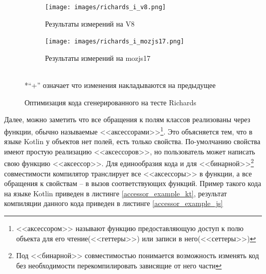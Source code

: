 \begin{figure}[ht!]
\centering
	\begin{subfigure}[b]{0.7\textwidth}
	\centering
	\texttt{[image: images/richards\_i\_v8.png]}
	\caption{Результаты измерений на V8}
    \end{subfigure}

  	\begin{subfigure}[b]{0.7\textwidth}
	\centering
	\texttt{[image: images/richards\_i\_mozjs17.png]}
	\caption{Результаты измерений на mozjs17}
    \end{subfigure}
\\*``+'' означает что изменения накладываются на предыдущее
\caption{Оптимизация кода сгенерированного на тесте Richards}
\label{richards_i}
\end{figure}


Далее, можно заметить что все обращения к полям классов реализованы через функции, обычно называемые <<аксессорами>>\footnote{<<аксессором>> называют функцию предоставляющую доступ к полю объекта для его чтение(<<геттеры>>) или записи в него(<<сеттеры>>)}. Это объясняется тем, что в языке Kotlin у объектов нет полей, есть только свойства. По-умолчанию свойства имеют простую реализацию <<аксессоров>>, но пользователь может написать свою функцию <<аксессор>>. Для единообразия кода и для <<бинарной>>\footnote{Под <<бинарной>> совместимостью понимается возможность изменять код без необходимости перекомпилировать зависящие от него части}
совместимости компилятор транслирует все <<аксессоры>> в функции, а все обращения к свойствам -- в вызов соответствующих функций. Пример такого кода на языке Kotlin приведен в листинге \ref{accessor_example_kt}, результат компиляции данного кода приведен в листинге \ref{accessor_example_js}

\begin{code}
\end{code}

